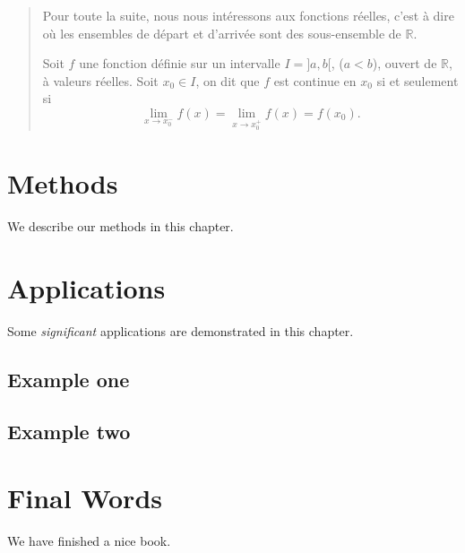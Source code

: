 \documentclass[]{book}
\theoremstyle{definition}
\theoremstyle{definition}
\theoremstyle{definition}
\theoremstyle{remark}
\let\BeginKnitrBlock\begin \let\EndKnitrBlock\end
\begin{document}
\begin{quote}
Pour toute la suite, nous nous intéressons aux fonctions réelles, c'est à dire où les ensembles de départ et d'arrivée sont des sous-ensemble de \(\mathbb R\).

\BeginKnitrBlock{definition}[Continuité]
\protect\hypertarget{def:unnamed-chunk-6}{}{\label{def:unnamed-chunk-6} \iffalse (Continuité) \fi{} }Soit \(f\) une fonction définie sur un intervalle \(I=]a,b[\), (\(a<b\)), ouvert de \(\mathbb R\), à valeurs réelles. Soit \(x_0\in I\), on dit que \(f\) est continue en \(x_0\) si et seulement si
\[
\lim_{x\rightarrow x_0^-}f(x)=\lim_{x\rightarrow x_0^+}f(x)=f(x_0).
\]
\EndKnitrBlock{definition}
\end{quote}

\hypertarget{methods}{%
\chapter{Methods}\label{methods}}

We describe our methods in this chapter.

\hypertarget{applications}{%
\chapter{Applications}\label{applications}}

Some \emph{significant} applications are demonstrated in this chapter.

\hypertarget{example-one}{%
\section{Example one}\label{example-one}}

\hypertarget{example-two}{%
\section{Example two}\label{example-two}}

\hypertarget{final-words}{%
\chapter{Final Words}\label{final-words}}

We have finished a nice book.


\end{document}
